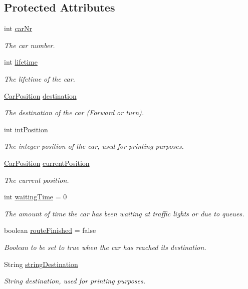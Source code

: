 \subsection*{Protected Attributes}
\begin{DoxyCompactItemize}
\item 
int \hyperlink{class_car_afde6b5c1b796970c1c57c3039058b731}{car\+Nr}
\begin{DoxyCompactList}\small\item\em The car number. \end{DoxyCompactList}\item 
int \hyperlink{class_car_a6c77e5ff6ce04822eca2d7b246d3b516}{lifetime}
\begin{DoxyCompactList}\small\item\em The lifetime of the car. \end{DoxyCompactList}\item 
\hyperlink{class_car_position}{Car\+Position} \hyperlink{class_car_a8ec85c8488be9a19f14077fb861b7753}{destination}
\begin{DoxyCompactList}\small\item\em The destination of the car (Forward or turn). \end{DoxyCompactList}\item 
int \hyperlink{class_car_a37c19f61aed67e2b9ec340f5ef4f99bd}{int\+Position}
\begin{DoxyCompactList}\small\item\em The integer position of the car, used for printing purposes. \end{DoxyCompactList}\item 
\hyperlink{class_car_position}{Car\+Position} \hyperlink{class_car_aa2011891bfead81fe201257172843a95}{current\+Position}
\begin{DoxyCompactList}\small\item\em The current position. \end{DoxyCompactList}\item 
int \hyperlink{class_car_a523ff2c3f03e44be3ca40596f8e0ca43}{waiting\+Time} = 0
\begin{DoxyCompactList}\small\item\em The amount of time the car has been waiting at traffic lights or due to queues. \end{DoxyCompactList}\item 
boolean \hyperlink{class_car_aefe0e86fc27b1175e338447493c169a4}{route\+Finished} = false
\begin{DoxyCompactList}\small\item\em Boolean to be set to true when the car has reached its destination. \end{DoxyCompactList}\item 
String \hyperlink{class_car_a94ad7e01cd9c699c28bd77b773b883fe}{string\+Destination}
\begin{DoxyCompactList}\small\item\em String destination, used for printing purposes. \end{DoxyCompactList}\end{DoxyCompactItemize}


